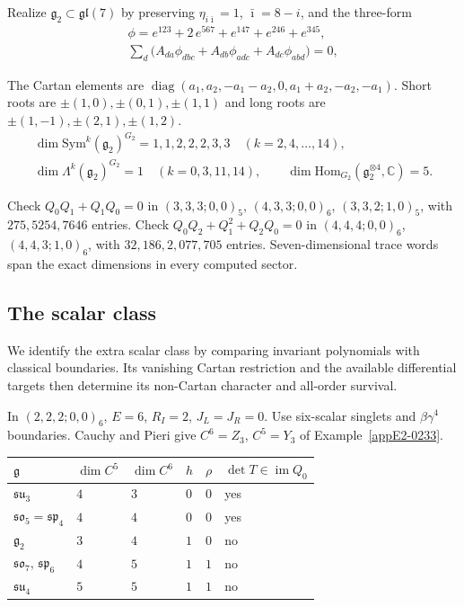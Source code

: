 \documentclass[11pt]{article}
\numberwithin{equation}{section}
\numberwithin{figure}{section}
\numberwithin{table}{section}
\begin{document}
Realize $\mathfrak g_2\subset\mathfrak{gl}(7)$ by preserving $\eta_{i\bar\imath}=1$, $\bar\imath=8-i$, and the three-form
\begin{equation}\label{eq-E-phi}
\begin{gathered}\phi=e^{123}+2\,e^{567}+e^{147}+e^{246}+e^{345},\\ \sum_d\bigl(A_{da}\phi_{dbc}+A_{db}\phi_{adc}+A_{dc}\phi_{abd}\bigr)=0,\end{gathered}
\end{equation}

The Cartan elements are $\operatorname{diag}(a_1,a_2,-a_1-a_2,0,a_1+a_2,-a_2,-a_1)$. Short roots are $\pm(1,0),\pm(0,1),\pm(1,1)$ and long roots are $\pm(1,-1),\pm(2,1),\pm(1,2)$.
\begin{equation*}
\begin{gathered}\dim\mathrm{Sym}^k(\mathfrak g_2)^{G_2}=1,1,2,2,2,3,3\quad(k=2,4,\ldots,14),\\\dim\Lambda^k(\mathfrak g_2)^{G_2}=1\quad(k=0,3,11,14),\qquad\dim\mathrm{Hom}_{G_2}(\mathfrak g_2^{\otimes4},\mathbb C)=5.\end{gathered}
\end{equation*}

Check $Q_0Q_1+Q_1Q_0=0$ in $(3,3,3;0,0)_5$, $(4,3,3;0,0)_6$, $(3,3,2;1,0)_5$, with $275,5254,7646$ entries. Check $Q_0Q_2+Q_1^2+Q_2Q_0=0$ in $(4,4,4;0,0)_6$, $(4,4,3;1,0)_6$, with $32{,}186,2{,}077{,}705$ entries. Seven-dimensional trace words span the exact dimensions in every computed sector.

\subsection{The scalar class}\label{sec-E-G2-class}

We identify the extra scalar class by comparing invariant polynomials with classical boundaries. Its vanishing Cartan restriction and the available differential targets then determine its non-Cartan character and all-order survival.

In $(2,2,2;0,0)_6$, $E=6$, $R_I=2$, $J_L=J_R=0$. Use six-scalar singlets and $\beta\gamma^4$ boundaries. Cauchy and Pieri give $C^6=Z_3$, $C^5=Y_3$ of Example~\ref{appE2-0233}.

{\small\renewcommand{\arraystretch}{1.25}\setlength{\tabcolsep}{4pt}
\begin{xltabular}{\linewidth}{@{}lllll>{\raggedright\arraybackslash}X@{}}
\toprule
$\mathfrak g$ & $\dim C^5$ & $\dim C^6$ & $h$ & $\rho$ & $\det T\in\operatorname{im}Q_0$\\
\midrule\endhead
$\mathfrak{su}_3$ & $4$ & $3$ & $0$ & $0$ & yes\\
$\mathfrak{so}_5=\mathfrak{sp}_4$ & $4$ & $4$ & $0$ & $0$ & yes\\
$\mathfrak g_2$ & $3$ & $4$ & $1$ & $0$ & no\\
$\mathfrak{so}_7$, $\mathfrak{sp}_6$ & $4$ & $5$ & $1$ & $1$ & no\\
$\mathfrak{su}_4$ & $5$ & $5$ & $1$ & $1$ & no\\
\bottomrule
\end{xltabular}}
\end{document}
